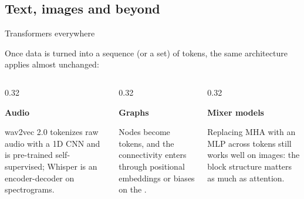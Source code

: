 \subsection{Text, images and beyond}

\begin{frame}{Transformers everywhere}
    \setlength{\parskip}{6pt}

    Once data is turned into a sequence (or a set) of tokens, the same
    architecture applies almost unchanged:

    \begin{columns}[T,onlytextwidth]
        \begin{column}{0.32\textwidth}
            \begin{tcolorbox}[nndsblue,courseheight={tf-everywhere}{0.36\textheight}]\small
                \textbf{\color{darkcerulean}Audio}\par
                \RaggedRight
                wav2vec 2.0 tokenizes raw audio with a 1D CNN and is
                pre-trained self-supervised; Whisper is an encoder-decoder on
                spectrograms.
            \end{tcolorbox}
        \end{column}
        \begin{column}{0.32\textwidth}
            \begin{tcolorbox}[nndsgreen,courseheight={tf-everywhere}{0.36\textheight}]\small
                \textbf{\color{darkgreen}Graphs}\par
                \RaggedRight
                Nodes become tokens, and the connectivity enters through
                positional embeddings or biases on the .
            \end{tcolorbox}
        \end{column}
        \begin{column}{0.32\textwidth}
            \begin{tcolorbox}[nndsorange,courseheight={tf-everywhere}{0.36\textheight}]\small
                \textbf{\color{draworange!70!black}Mixer models}\par
                \RaggedRight
                Replacing MHA with an MLP across tokens still works well on
                images: the block structure matters as much as attention.
            \end{tcolorbox}
        \end{column}
    \end{columns}


\end{frame}

